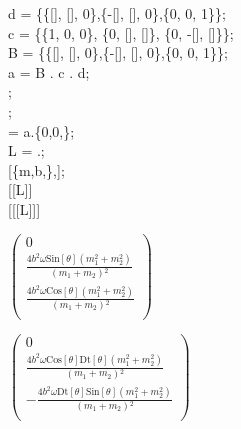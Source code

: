 \documentclass{article}
\begin{document}
d = \{\{[\phi ], [\phi ], 0\},\{-[\phi ], [\phi ], 0\},\{0, 0, 1\}\};\\
c = \{\{1, 0, 0\}, \{0, [\theta ], [\theta ]\}, \{0, -[\theta ], [\theta ]\}\};\\
B = \{\{[\psi ], [\psi ], 0\},\{-[\psi ], [\psi ], 0\},\{0, 0, 1\}\};\\
a = B . c . d;\\
;\\
;\\
 = a.\{0,0,\omega \};\\
L = .;\\
[\{m,b,\omega \},];\\
[[L]]\\
[[[L]]]

\begin{doublespace}
\noindent\(\left(
\begin{array}{c}
 0 \\
 \frac{4 b^2 \omega  \text{Sin}[\theta ] \left(m_1^2+m_2^2\right)}{\left(m_1+m_2\right){}^2} \\
 \frac{4 b^2 \omega  \text{Cos}[\theta ] \left(m_1^2+m_2^2\right)}{\left(m_1+m_2\right){}^2} \\
\end{array}
\right)\)
\end{doublespace}

\begin{doublespace}
\noindent\(\left(
\begin{array}{c}
 0 \\
 \frac{4 b^2 \omega  \text{Cos}[\theta ] \text{Dt}[\theta ] \left(m_1^2+m_2^2\right)}{\left(m_1+m_2\right){}^2} \\
 -\frac{4 b^2 \omega  \text{Dt}[\theta ] \text{Sin}[\theta ] \left(m_1^2+m_2^2\right)}{\left(m_1+m_2\right){}^2} \\
\end{array}
\right)\)
\end{doublespace}
\end{document}
